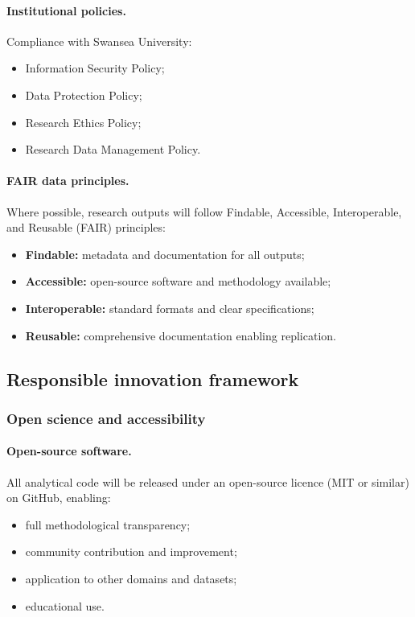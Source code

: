 \paragraph{Institutional policies.}
Compliance with Swansea University:
\begin{itemize}
  \item Information Security Policy;
  \item Data Protection Policy;
  \item Research Ethics Policy;
  \item Research Data Management Policy.
\end{itemize}

\paragraph{FAIR data principles.}
Where possible, research outputs will follow Findable, Accessible, Interoperable, and Reusable (FAIR) principles:
\begin{itemize}
  \item \textbf{Findable:} metadata and documentation for all outputs;
  \item \textbf{Accessible:} open-source software and methodology available;
  \item \textbf{Interoperable:} standard formats and clear specifications;
  \item \textbf{Reusable:} comprehensive documentation enabling replication.
\end{itemize}

\subsection{Responsible innovation framework}

\subsubsection{Open science and accessibility}

\paragraph{Open-source software.}
All analytical code will be released under an open-source licence (MIT or similar) on GitHub, enabling:
\begin{itemize}
  \item full methodological transparency;
  \item community contribution and improvement;
  \item application to other domains and datasets;
  \item educational use.
\end{itemize}

